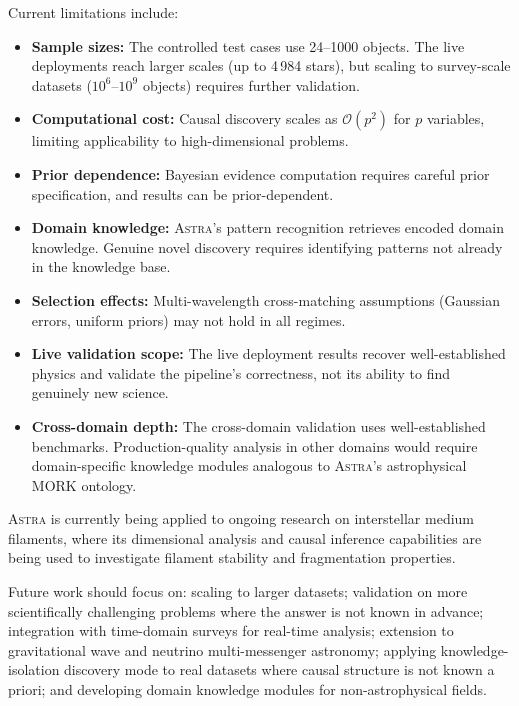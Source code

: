 \documentclass[usenatbib]{rasti}
\newcommand{\astra}{\textsc{Astra}\xspace}
\begin{document}
Current limitations include:
\begin{itemize}
  \item \textbf{Sample sizes:} The controlled test cases use 24--1000 objects. The live deployments reach larger scales (up to 4\,984 stars), but scaling to survey-scale datasets ($10^{6}$--$10^{9}$ objects) requires further validation.
  \item \textbf{Computational cost:} Causal discovery scales as $\mathcal{O}(p^2)$ for $p$ variables, limiting applicability to high-dimensional problems.
  \item \textbf{Prior dependence:} Bayesian evidence computation requires careful prior specification, and results can be prior-dependent.
  \item \textbf{Domain knowledge:} \astra's pattern recognition retrieves encoded domain knowledge. Genuine novel discovery requires identifying patterns not already in the knowledge base.
  \item \textbf{Selection effects:} Multi-wavelength cross-matching assumptions (Gaussian errors, uniform priors) may not hold in all regimes.
  \item \textbf{Live validation scope:} The live deployment results recover well-established physics and validate the pipeline's correctness, not its ability to find genuinely new science.
  \item \textbf{Cross-domain depth:} The cross-domain validation uses well-established benchmarks. Production-quality analysis in other domains would require domain-specific knowledge modules analogous to \astra's astrophysical MORK ontology.
\end{itemize}

\astra is currently being applied to ongoing research on interstellar medium filaments, where its dimensional analysis and causal inference capabilities are being used to investigate filament stability and fragmentation properties.

Future work should focus on: scaling to larger datasets; validation on more scientifically challenging problems where the answer is not known in advance; integration with time-domain surveys for real-time analysis; extension to gravitational wave and neutrino multi-messenger astronomy; applying knowledge-isolation discovery mode to real datasets where causal structure is not known a priori; and developing domain knowledge modules for non-astrophysical fields.

\end{document}
